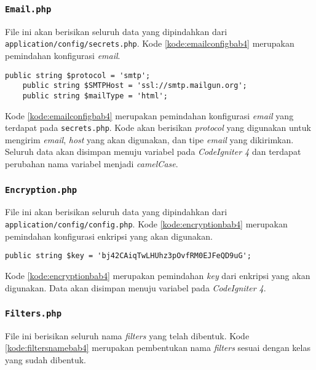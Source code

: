 \subsubsection{\texttt{Email.php}}
File ini akan berisikan seluruh data yang dipindahkan dari \texttt{application/config/secrets.php}. Kode \ref{kode:emailconfigbab4} merupakan pemindahan konfigurasi \textit{email}.

\begin{lstlisting}[caption=Pemindahan \texttt{app/config/secrets.php} menuju \texttt{Email.php}, label=kode:emailconfigbab4]
    public string $protocol = 'smtp';
    public string $SMTPHost = 'ssl://smtp.mailgun.org';
    public string $mailType = 'html';
\end{lstlisting}

Kode \ref{kode:emailconfigbab4} merupakan pemindahan konfigurasi \textit{email} yang terdapat pada \texttt{secrets.php}. Kode akan berisikan \textit{protocol} yang digunakan untuk mengirim \textit{email}, \textit{host} yang akan digunakan, dan tipe \textit{email} yang dikirimkan. Seluruh data akan disimpan menuju variabel pada \textit{CodeIgniter 4} dan terdapat perubahan nama variabel menjadi \textit{camelCase}.

\subsubsection{\texttt{Encryption.php}}
File ini akan berisikan seluruh data yang dipindahkan dari \texttt{application/config/config.php}. Kode \ref{kode:encryptionbab4} merupakan pemindahan konfigurasi enkripsi yang akan digunakan.

\begin{lstlisting}[caption=Pemindahan \texttt{app/config/config.php} menuju \texttt{Encryption.php}, label=kode:encryptionbab4]
    public string $key = 'bj42CAiqTwLHUhz3pOvfRM0EJFeQD9uG';
\end{lstlisting}

Kode \ref{kode:encryptionbab4} merupakan pemindahan \textit{key} dari enkripsi yang akan digunakan. Data akan disimpan menuju variabel pada \textit{CodeIgniter 4}.

\subsubsection{\texttt{Filters.php}}
\label{subsubsec:filters}
File ini berisikan seluruh nama \textit{filters} yang telah dibentuk. Kode \ref{kode:filtersnamebab4} merupakan pembentukan nama \textit{filters} sesuai dengan kelas yang sudah dibentuk.

